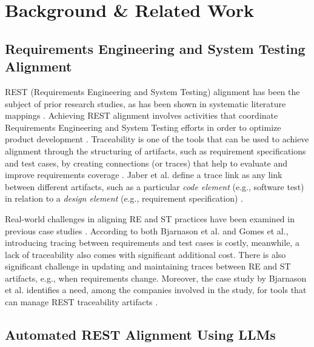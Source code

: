 \documentclass[conference]{IEEEtran}
\begin{document}
\section{Background \& Related Work}\label{background}

\subsection{Requirements Engineering and System Testing Alignment}

REST (Requirements Engineering and System Testing) alignment has been the subject of prior research studies, as has been shown in systematic literature mappings \cite{barmi2011Alignment, karhaapa2017What}. Achieving REST alignment involves activities that coordinate Requirements Engineering and System Testing efforts in order to optimize product development \cite{unterkalmsteiner2014Taxonomy}. Traceability is one of the tools that can be used to achieve alignment through the structuring of artifacts, such as requirement specifications and test cases, by creating connections (or traces) that help to evaluate and improve requirements coverage \cite{bjarnason2014Challenges}. Jaber et al. define a trace link as any link between different artifacts, such as a particular \textit{code element} (e.g., software test) in relation to a \textit{design element} (e.g., requirement specification) \cite{jaber2013Effect}. 

Real-world challenges in aligning RE and ST practices have been examined in previous case studies \cite{bjarnason2014Challenges,gomes2017Challenges}. According to both Bjarnason et al. and Gomes et al., introducing tracing between requirements and test cases is costly, meanwhile, a lack of traceability also comes with significant additional cost. There is also significant challenge in updating and maintaining traces between RE and ST artifacts, e.g., when requirements change. Moreover, the case study by Bjarnason et al. identifies a need, among the companies involved in the study, for tools that can manage REST traceability artifacts \cite{bjarnason2014Challenges}.

\subsection{Automated REST Alignment Using LLMs} 
\end{document}
